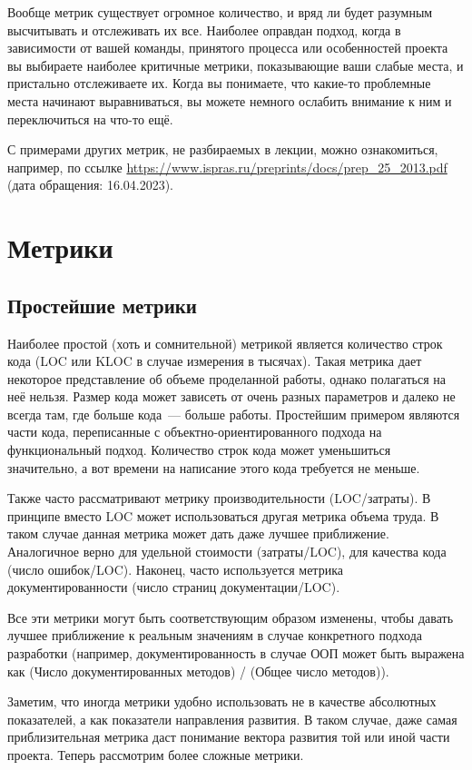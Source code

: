 \documentclass{../../text-style}
\begin{document}
Вообще метрик существует огромное количество, и вряд ли будет разумным высчитывать и отслеживать их все. Наиболее оправдан подход, когда в зависимости от вашей команды, принятого процесса или особенностей проекта вы выбираете наиболее критичные метрики, показывающие ваши слабые места, и пристально отслеживаете их. Когда вы понимаете, что какие-то проблемные места начинают выравниваться, вы можете немного ослабить внимание к ним и переключиться на что-то ещё. 

С примерами других метрик, не разбираемых в лекции, можно ознакомиться, например, по ссылке \url{https://www.ispras.ru/preprints/docs/prep_25_2013.pdf} (дата обращения: 16.04.2023).

\section{Метрики}

\subsection{Простейшие метрики}

Наиболее простой (хоть и сомнительной) метрикой является количество строк кода (LOC или KLOC в случае измерения в тысячах). Такая метрика дает некоторое представление об объеме проделанной работы, однако полагаться на неё нельзя. Размер кода может зависеть от очень разных параметров и далеко не всегда там, где больше кода~--- больше работы. Простейшим примером являются части кода, переписанные с объектно-ориентированного подхода на функциональный подход. Количество строк кода может уменьшиться значительно, а вот времени на написание этого кода требуется не меньше.

Также часто рассматривают метрику производительности (LOC/затраты). В принципе вместо LOC может использоваться другая метрика объема труда. В таком случае данная метрика может дать даже лучшее приближение. Аналогичное верно для удельной стоимости (затраты/LOC), для качества кода (число ошибок/LOC). Наконец, часто используется метрика документированности (число страниц документации/LOC).

Все эти метрики могут быть соответствующим образом изменены, чтобы давать лучшее приближение к реальным значениям в случае конкретного подхода разработки (например, документированность в случае ООП может быть выражена как (Число документированных методов) / (Общее число методов)).

Заметим, что иногда метрики удобно использовать не в качестве абсолютных показателей, а как показатели направления развития. В таком случае, даже самая приблизительная метрика даст понимание вектора развития той или иной части проекта.
Теперь рассмотрим более сложные метрики.
\end{document}
